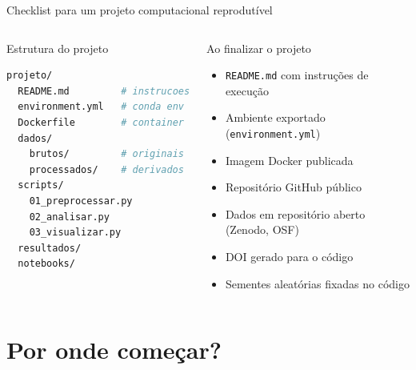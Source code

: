 \begin{frame}[fragile]{Checklist para um projeto computacional reprodutível}
\begin{columns}
\begin{exampleblock}{Estrutura do projeto}
\begin{lstlisting}[numbers=none, basicstyle=\ttfamily\tiny, language=bash]
projeto/
  README.md         # instrucoes
  environment.yml   # conda env
  Dockerfile        # container
  dados/
    brutos/         # originais
    processados/    # derivados
  scripts/
    01_preprocessar.py
    02_analisar.py
    03_visualizar.py
  resultados/
  notebooks/
\end{lstlisting}
\end{exampleblock}

\begin{block}{Ao finalizar o projeto}
\begin{itemize}
    \item[$\square$] \texttt{README.md} com instruções de execução
    \item[$\square$] Ambiente exportado (\texttt{environment.yml})
    \item[$\square$] Imagem Docker publicada
    \item[$\square$] Repositório GitHub público
    \item[$\square$] Dados em repositório aberto (Zenodo, OSF)
    \item[$\square$] DOI gerado para o código
    \item[$\square$] Sementes aleatórias fixadas no código
\end{itemize}
\end{block}
\end{columns}
\end{frame}

\section{Por onde começar?}

